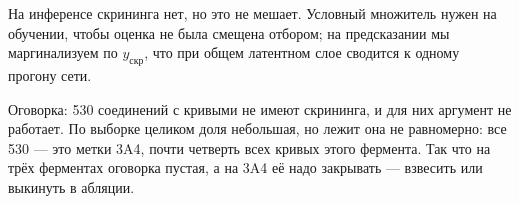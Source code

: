 На инференсе скрининга нет, но это не мешает. Условный множитель нужен на обучении, чтобы оценка
не была смещена отбором; на предсказании мы маргинализуем по $y_{\text{скр}}$, что при общем латентном
слое сводится к одному прогону сети.

Оговорка: 530 соединений с кривыми не имеют скрининга, и для них аргумент не работает. По выборке
целиком доля небольшая, но лежит она не равномерно: все 530 --- это метки 3A4, почти четверть всех
кривых этого фермента. Так что на трёх ферментах оговорка пустая, а на 3A4 её надо закрывать --- взвесить
или выкинуть в абляции.
